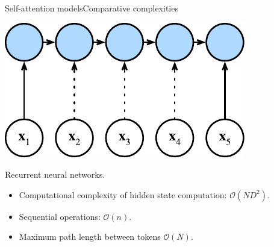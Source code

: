 \documentclass{beamer}
\begin{document}
\begin{frame}{Self-attention models}{Comparative complexities}

\begin{multicols}{2}
\begin{center}
\includegraphics[scale=0.6]{Module 6 (Attention-based networks)/pics/rnn-complexity.pdf}
\end{center}

\columnbreak
Recurrent neural networks.
\begin{itemize}
    \item Computational complexity of hidden state computation: $\mathcal{O}(ND^2)$.
    \item Sequential operations: $\mathcal{O}(n)$.
    \item Maximum path length between tokens $\mathcal{O}(N)$. 
\end{itemize}

\end{multicols}
\end{frame}
\end{document}
